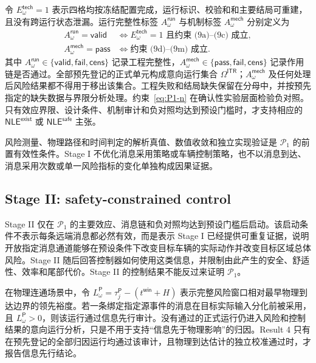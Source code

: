 \documentclass[10pt,a4paper,twocolumn]{article}
\begin{document}
令 $E_{\omega}^{\mathsf{tech}}=1$ 表示四格均按冻结配置完成，运行标识、校验和和主要结局可重建，且没有跨运行状态泄漏。运行完整性标签 $A_{\omega}^{\mathsf{run}}$ 与机制标签 $A_{\omega}^{\mathsf{mech}}$ 分别定义为
\begin{equation}
\begin{aligned}
A_{\omega}^{\mathsf{run}}=\mathsf{valid}
&\Longleftrightarrow E_{\omega}^{\mathsf{tech}}=1
\text{ 且约束 (9a)--(9c) 成立},\\
A_{\omega}^{\mathsf{mech}}=\mathsf{pass}
&\Longleftrightarrow\text{约束 (9d)--(9m) 成立}.
\end{aligned}
\end{equation}
其中 $A_{\omega}^{\mathsf{run}}\in\{\mathsf{valid},\mathsf{fail},\mathsf{cens}\}$ 记录工程完整性，$A_{\omega}^{\mathsf{mech}}\in\{\mathsf{pass},\mathsf{fail},\mathsf{cens}\}$ 记录作用链是否通过。全部预先登记的正式单元构成意向运行集合 $\Omega^{\mathsf{ITR}}$；$A_{\omega}^{\mathsf{mech}}$ 及任何处理后风险结果都不得用于移出该集合。工程失败和结局缺失保留在分母中，并按预先指定的缺失数据与界限分析处理。约束~\eqref{eq:P1-n} 在确认性实验层面检验负对照。只有效应界限、设计条件、机制审计和负对照均达到预设门槛时，才支持相应的 $\mathsf{NLE}^{\mathsf{exist}}$ 或 $\mathsf{NLE}^{\mathsf{safe}}$ 主张。

风险测量、物理路径和时间判定的解析真值、数值收敛和独立实现验证是 $\mathcal P_1$ 的前置有效性条件。Stage I 不优化消息采用策略或车辆控制策略，也不以消息到达、消息采用次数或单一风险指标的变化单独构成因果证据。

\subsection*{Stage II: safety-constrained control}
Stage II 仅在 $\mathcal P_1$ 的主要效应、消息链和负对照均达到预设门槛后启动。该启动条件不表示每条远端消息都必然有效，而是表示 Stage I 已经提供可重复证据，说明开放指定消息通道能够在预设条件下改变目标车辆的实际动作并改变目标区域总体风险。Stage II 随后回答控制器如何使用这类信息，并限制由此产生的安全、舒适性、效率和尾部代价。Stage II 的控制结果不能反过来证明 $\mathcal P_1$。

在物理连通场景中，令 $L_{\omega}^{\mathsf P}=\tau_j^{\mathsf P}-(t^{\mathsf{win}}+H)$ 表示完整风险窗口相对最早物理到达边界的领先裕度。若一条绑定指定源事件的消息在目标实际输入分化前被采用，且 $L_{\omega}^{\mathsf P}>0$，则该运行通过信息先行审计。没有通过的正式运行仍进入风险和控制结果的意向运行分析，只是不用于支持“信息先于物理影响”的归因。Result 4 只有在预先登记的全部归因运行均通过该审计，且物理到达估计的独立校准通过时，才报告信息先行结论。
\end{document}
